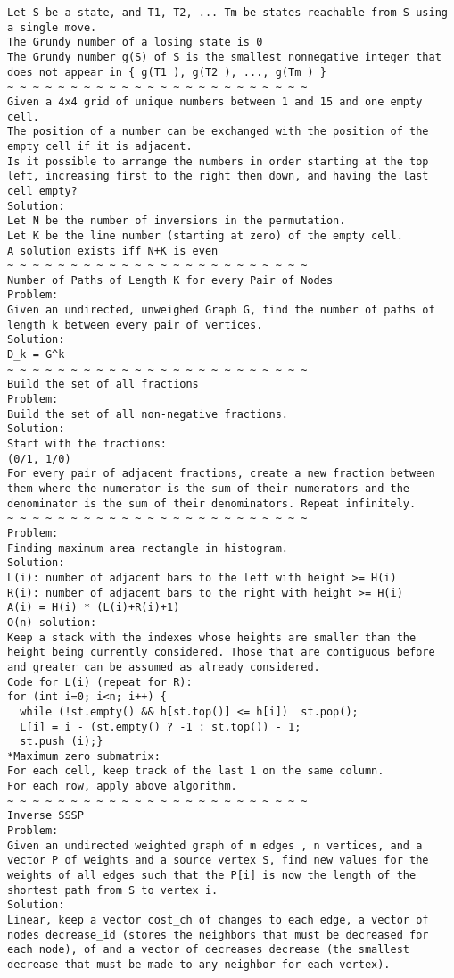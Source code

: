 \documentclass[11pt, oneside]{article}
\begin{document}
\begin{lstlisting}
Let S be a state, and T1, T2, ... Tm be states reachable from S using a single move.
The Grundy number of a losing state is 0
The Grundy number g(S) of S is the smallest nonnegative integer that does not appear in { g(T1 ), g(T2 ), ..., g(Tm ) }
~ ~ ~ ~ ~ ~ ~ ~ ~ ~ ~ ~ ~ ~ ~ ~ ~ ~ ~ ~ ~ ~ ~ ~
Given a 4x4 grid of unique numbers between 1 and 15 and one empty cell.
The position of a number can be exchanged with the position of the empty cell if it is adjacent.
Is it possible to arrange the numbers in order starting at the top left, increasing first to the right then down, and having the last cell empty?
Solution:
Let N be the number of inversions in the permutation.
Let K be the line number (starting at zero) of the empty cell.
A solution exists iff N+K is even
~ ~ ~ ~ ~ ~ ~ ~ ~ ~ ~ ~ ~ ~ ~ ~ ~ ~ ~ ~ ~ ~ ~ ~
Number of Paths of Length K for every Pair of Nodes
Problem:
Given an undirected, unweighed Graph G, find the number of paths of length k between every pair of vertices.
Solution:
D_k = G^k
~ ~ ~ ~ ~ ~ ~ ~ ~ ~ ~ ~ ~ ~ ~ ~ ~ ~ ~ ~ ~ ~ ~ ~
Build the set of all fractions
Problem:
Build the set of all non-negative fractions.
Solution:
Start with the fractions:
(0/1, 1/0)
For every pair of adjacent fractions, create a new fraction between them where the numerator is the sum of their numerators and the denominator is the sum of their denominators. Repeat infinitely.
~ ~ ~ ~ ~ ~ ~ ~ ~ ~ ~ ~ ~ ~ ~ ~ ~ ~ ~ ~ ~ ~ ~ ~
Problem:
Finding maximum area rectangle in histogram.
Solution:
L(i): number of adjacent bars to the left with height >= H(i)
R(i): number of adjacent bars to the right with height >= H(i)
A(i) = H(i) * (L(i)+R(i)+1)
O(n) solution:
Keep a stack with the indexes whose heights are smaller than the
height being currently considered. Those that are contiguous before
and greater can be assumed as already considered.
Code for L(i) (repeat for R):
for (int i=0; i<n; i++) {
  while (!st.empty() && h[st.top()] <= h[i])  st.pop();
  L[i] = i - (st.empty() ? -1 : st.top()) - 1;
  st.push (i);}
*Maximum zero submatrix:
For each cell, keep track of the last 1 on the same column.
For each row, apply above algorithm.
~ ~ ~ ~ ~ ~ ~ ~ ~ ~ ~ ~ ~ ~ ~ ~ ~ ~ ~ ~ ~ ~ ~ ~
Inverse SSSP
Problem:
Given an undirected weighted graph of m edges , n vertices, and a vector P of weights and a source vertex S, find new values for the weights of all edges such that the P[i] is now the length of the shortest path from S to vertex i.
Solution:
Linear, keep a vector cost_ch of changes to each edge, a vector of nodes decrease_id (stores the neighbors that must be decreased for each node), of and a vector of decreases decrease (the smallest decrease that must be made to any neighbor for each vertex). 

\end{lstlisting}
\end{document}
